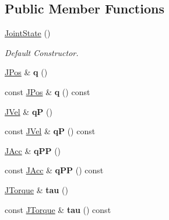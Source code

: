 \subsection*{Public Member Functions}
\begin{DoxyCompactItemize}
\item 
\hyperlink{classow__core_1_1JointState_a76834040169f792ff7a3c54d13fc34b7}{Joint\+State} ()\hypertarget{classow__core_1_1JointState_a76834040169f792ff7a3c54d13fc34b7}{}\label{classow__core_1_1JointState_a76834040169f792ff7a3c54d13fc34b7}

\begin{DoxyCompactList}\small\item\em Default Constructor. \end{DoxyCompactList}\item 
\hyperlink{classow__core_1_1JointPosition}{J\+Pos} \& {\bfseries q} ()\hypertarget{classow__core_1_1JointState_a185f41d427bc41b4136729c5f3fef0b8}{}\label{classow__core_1_1JointState_a185f41d427bc41b4136729c5f3fef0b8}

\item 
const \hyperlink{classow__core_1_1JointPosition}{J\+Pos} \& {\bfseries q} () const \hypertarget{classow__core_1_1JointState_ac270c084ab9f0fbafcc97e591faa896e}{}\label{classow__core_1_1JointState_ac270c084ab9f0fbafcc97e591faa896e}

\item 
\hyperlink{classow__core_1_1JointVelocity}{J\+Vel} \& {\bfseries qP} ()\hypertarget{classow__core_1_1JointState_a8cbbd546d0624376c328cf701d10d333}{}\label{classow__core_1_1JointState_a8cbbd546d0624376c328cf701d10d333}

\item 
const \hyperlink{classow__core_1_1JointVelocity}{J\+Vel} \& {\bfseries qP} () const \hypertarget{classow__core_1_1JointState_a57cc7ee7e3437d567f262e3c7747bdb1}{}\label{classow__core_1_1JointState_a57cc7ee7e3437d567f262e3c7747bdb1}

\item 
\hyperlink{classow__core_1_1JointAcceleration}{J\+Acc} \& {\bfseries q\+PP} ()\hypertarget{classow__core_1_1JointState_a6fc2f5adf0d20fb3682f25639b545125}{}\label{classow__core_1_1JointState_a6fc2f5adf0d20fb3682f25639b545125}

\item 
const \hyperlink{classow__core_1_1JointAcceleration}{J\+Acc} \& {\bfseries q\+PP} () const \hypertarget{classow__core_1_1JointState_a4acf99a2437e4dd9a654fd6cd4774ae7}{}\label{classow__core_1_1JointState_a4acf99a2437e4dd9a654fd6cd4774ae7}

\item 
\hyperlink{classow__core_1_1JointEffort}{J\+Torque} \& {\bfseries tau} ()\hypertarget{classow__core_1_1JointState_aa90b698b021686874d5243ca6d2e8da0}{}\label{classow__core_1_1JointState_aa90b698b021686874d5243ca6d2e8da0}

\item 
const \hyperlink{classow__core_1_1JointEffort}{J\+Torque} \& {\bfseries tau} () const \hypertarget{classow__core_1_1JointState_a09dd3ce70cbe13ce1abc59ecbffbfe15}{}\label{classow__core_1_1JointState_a09dd3ce70cbe13ce1abc59ecbffbfe15}

\end{DoxyCompactItemize}
